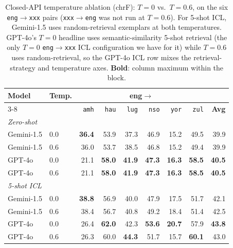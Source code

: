 \begin{table}[t]
\centering
\small
\renewcommand{\arraystretch}{1.05}
\begin{tabular}{llrrrrrrr}
\toprule
\textbf{Model} & \textbf{Temp.} & \multicolumn{6}{c}{\textbf{eng$\to$}} & \\
\cmidrule(lr){3-8}
   &    & \texttt{amh} & \texttt{hau} & \texttt{lug} & \texttt{nso} & \texttt{yor} & \texttt{zul} & \textbf{Avg} \\
\midrule
\multicolumn{9}{l}{\textit{Zero-shot}} \\
\midrule
Gemini-1.5 & 0.0 & \textbf{36.4} & 53.9 & 37.3 & 46.9 & 15.2 & 49.5 & 39.9 \\
Gemini-1.5 & 0.6 & 36.0 & 53.7 & 38.5 & 46.8 & 15.2 & 49.4 & 39.9 \\
GPT-4o & 0.0 & 21.1 & \textbf{58.0} & \textbf{41.9} & \textbf{47.3} & \textbf{16.3} & \textbf{58.5} & \textbf{40.5} \\
GPT-4o & 0.6 & 21.1 & \textbf{58.0} & \textbf{41.9} & \textbf{47.3} & \textbf{16.3} & \textbf{58.5} & \textbf{40.5} \\
\midrule
\midrule
\multicolumn{9}{l}{\textit{5-shot ICL}} \\
\midrule
Gemini-1.5 & 0.0 & \textbf{38.8} & 56.9 & 40.0 & 47.9 & 17.5 & 51.7 & 42.1 \\
Gemini-1.5 & 0.6 & 38.4 & 56.7 & 40.8 & 49.2 & 18.4 & 51.4 & 42.5 \\
GPT-4o & 0.0 & 26.4 & \textbf{62.0} & 42.3 & \textbf{53.6} & \textbf{20.7} & 57.9 & \textbf{43.8} \\
GPT-4o & 0.6 & 26.3 & 60.0 & \textbf{44.3} & 51.7 & 15.7 & \textbf{60.1} & 43.0 \\
\bottomrule
\end{tabular}
\caption{Closed-API temperature ablation (chrF): $T{=}0$ vs.\ $T{=}0.6$, on the six \texttt{eng}$\to$\texttt{xxx} pairs (\texttt{xxx}$\to$\texttt{eng} was not run at $T{=}0.6$). For 5-shot ICL, Gemini-1.5 uses random-retrieval exemplars at both temperatures. GPT-4o's $T{=}0$ headline uses semantic-similarity 5-shot retrieval (the only $T{=}0$ \texttt{eng}$\to$\texttt{xxx} ICL configuration we have for it) while $T{=}0.6$ uses random-retrieval, so the GPT-4o ICL row mixes the retrieval-strategy and temperature axes. \textbf{Bold}: column maximum within the block.}
\label{tab:temp_ablation_chrf}
\end{table}
